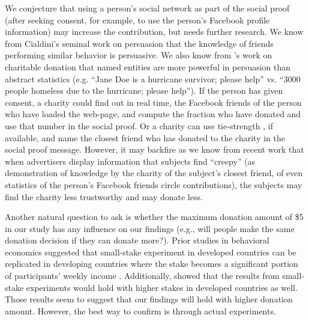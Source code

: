 \begin{description} [leftmargin=\parindent,topsep=0pt,partopsep=3pt,parsep=0pt,itemsep=3pt, listparindent=\parindent]
    We conjecture that using a person's social network as part of the social proof (after seeking consent, for example, to use the person's Facebook profile information) may increase the contribution, but needs further research. We know from Cialdini's seminal work on persuasion that the knowledge of friends performing similar behavior is persuasive. We also know from \textcite{small2007sympathy}'s work on charitable donation that named entities are more powerful in persuasion than abstract statistics (e.g. ``Jane Doe is a hurricane survivor; please help'' vs. ``3000 people homeless due to the hurricane; please help''). If the person has given consent, a charity could find out in real time, the Facebook friends of the person who have loaded the web-page, and compute the fraction who have donated and use that number in the social proof. Or a charity can use tie-strength \cite{Gilbert}, if available, and name the closest friend who has donated to the charity in the social proof message. However, it may backfire as we know from recent work \cite{eslami2018communicating} that when advertisers display information that subjects find ``creepy'' (as demonstration of knowledge by the charity of the subject's closest friend, of even statistics of the person's Facebook friends circle contributions), the subjects may find the charity less trustworthy and may donate less.
    
    \item[Donation Amount:] Another natural question to ask is whether the maximum donation amount of  \$5  in our study has any influence on our findings (e.g., will people make the same donation decision if they can donate more?).  Prior studies in behavioral economics suggested that small-stake experiment in developed countries can be replicated in developing countries where the stake becomes a significant portion of participants' weekly income \cite{binswanger1980attitudes,binswanger1981attitudes,kachelmeier1992examining}. Additionally, \textcite{post2008deal} showed that the results from small-stake experiments would hold with higher stakes in developed countries as well. Those results seem to suggest that our findings will hold with higher donation amount. However, the best way to confirm is through actual experiments. 
    

\end{description}
